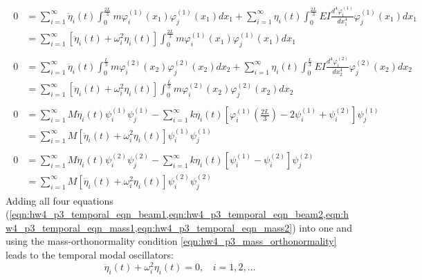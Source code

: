 \begin{subequations}
\begin{align}
\begin{split}\label{eqn:hw4_p3_temporal_eqn_beam1}
    0 &= \sum_{i=1}^\infty \ddot{\eta}_i(t) \int_0^{\frac{2L}{3}} m \varphi_i^{(1)} (x_1) \varphi_j^{(1)}(x_1) dx_1 + \sum_{i=1}^\infty \eta_i(t) \int_0^{\frac{2L}{3}} EI \frac{d^4\varphi_i^{(1)}}{dx_1^4} \varphi_j^{(1)}(x_1) dx_1 \\
    &= \sum_{i=1}^\infty \left[\ddot{\eta}_i(t) + \omega_i^2 \eta_i(t) \right] \int_0^{\frac{2L}{3}} m \varphi_i^{(1)} (x_1) \varphi_j^{(1)}(x_1) dx_1 
\end{split}\\
\begin{split}\label{eqn:hw4_p3_temporal_eqn_beam2}
    0 &= \sum_{i=1}^\infty \ddot{\eta}_i(t) \int_0^{\frac{L}{3}} m \varphi_i^{(2)} (x_2) \varphi_j^{(2)}(x_2) dx_2 + \sum_{i=1}^\infty \eta_i(t) \int_0^{\frac{L}{3}} EI \frac{d^4\varphi_i^{(2)}}{dx_2^4} \varphi_j^{(2)}(x_2) dx_2 \\
    &= \sum_{i=1}^\infty \left[\ddot{\eta}_i(t) + \omega_i^2 \eta_i(t) \right] \int_0^{\frac{L}{3}} m \varphi_i^{(2)} (x_2) \varphi_j^{(2)}(x_2) dx_2
\end{split}\\
\begin{split}\label{eqn:hw4_p3_temporal_eqn_mass1}
    0 &= \sum_{i=1}^\infty M \ddot{\eta}_i(t) \psi_i^{(1)} \psi_j^{(1)} - \sum_{i=1}^\infty k\eta_i(t) \left[\varphi_i^{(1)}\left(\frac{2L}{3}\right) - 2\psi_i^{(1)} + \psi_i^{(2)} \right] \psi_j^{(1)} \\
    &= \sum_{i=1}^\infty M \left[\ddot{\eta}_i(t) + \omega_i^2 \eta_i(t) \right]  \psi_i^{(1)} \psi_j^{(1)}
\end{split}\\
\begin{split}\label{eqn:hw4_p3_temporal_eqn_mass2}
    0 &= \sum_{i=1}^\infty M \ddot{\eta}_i(t) \psi_i^{(2)} \psi_j^{(2)} - \sum_{i=1}^\infty k\eta_i(t) \left[\psi_i^{(1)} - \psi_i^{(2)}\right] \psi_j^{(2)} \\
    &= \sum_{i=1}^\infty M \left[\ddot{\eta}_i(t) + \omega_i^2 \eta_i(t) \right]  \psi_i^{(2)} \psi_j^{(2)}
\end{split}
\end{align}
\end{subequations}
Adding all four equations (\cref{eqn:hw4_p3_temporal_eqn_beam1,eqn:hw4_p3_temporal_eqn_beam2,eqn:hw4_p3_temporal_eqn_mass1,eqn:hw4_p3_temporal_eqn_mass2}) into one and using the mass-orthonormality condition \cref{eqn:hw4_p3_mass_orthonormality} leads to the temporal modal oscillators:
\begin{equation}
    \boxed{\ddot{\eta}_i(t) + \omega_i^2 \eta_i(t) = 0}, ~~~~ i = 1, 2, \ldots
\end{equation}


